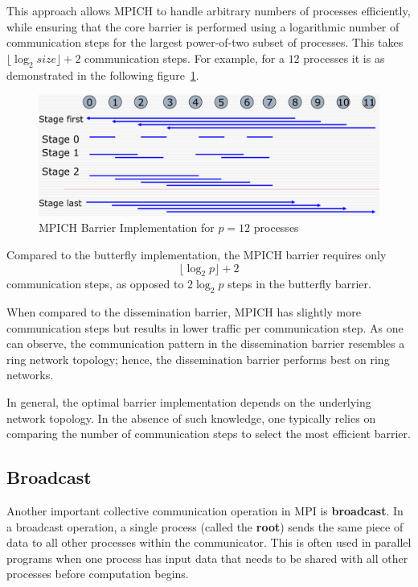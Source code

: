 \documentclass[12pt]{book}
\begin{document}
This approach allows MPICH to handle arbitrary numbers of processes efficiently, while ensuring that the core barrier is performed using a logarithmic number of communication steps for the largest power-of-two subset of processes. This takes $\lfloor \log_2 size\rfloor +2$ communication steps. For example, for a $12$ processes it is as demonstrated in the following figure~\ref{fig:MPICHbarrier}.
\begin{figure}
    \centering
    \includegraphics[width=0.75\linewidth]{images/MPICH.png}
    \caption{MPICH Barrier Implementation for $p=12$ processes}
    \label{fig:MPICHbarrier}
\end{figure}
Compared to the butterfly implementation, the MPICH barrier requires only 
\[
\lfloor \log_2 p \rfloor + 2
\]
communication steps, as opposed to $2\log_2 p$ steps in the butterfly barrier. 

When compared to the dissemination barrier, MPICH has slightly more communication steps but results in lower traffic per communication step. As one can observe, the communication pattern in the dissemination barrier resembles a ring network topology; hence, the dissemination barrier performs best on ring networks.

In general, the optimal barrier implementation depends on the underlying network topology. In the absence of such knowledge, one typically relies on comparing the number of communication steps to select the most efficient barrier.





\subsection{Broadcast}

Another important collective communication operation in MPI is \textbf{broadcast}. In a broadcast operation, a single process (called the \textbf{root}) sends the same piece of data to all other processes within the communicator. This is often used in parallel programs when one process has input data that needs to be shared with all other processes before computation begins.
\end{document}
